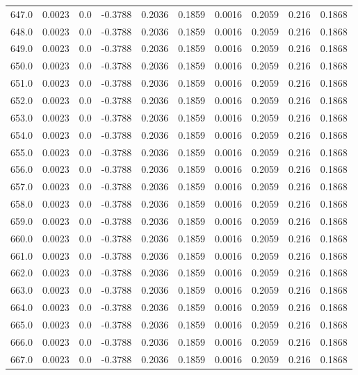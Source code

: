 \begin{longtable}{lrrrrrrrrr}
647.0 & 0.0023 & 0.0 & -0.3788 & 0.2036 & 0.1859 & 0.0016 & 0.2059 & 0.216 & 0.1868 \\
648.0 & 0.0023 & 0.0 & -0.3788 & 0.2036 & 0.1859 & 0.0016 & 0.2059 & 0.216 & 0.1868 \\
649.0 & 0.0023 & 0.0 & -0.3788 & 0.2036 & 0.1859 & 0.0016 & 0.2059 & 0.216 & 0.1868 \\
650.0 & 0.0023 & 0.0 & -0.3788 & 0.2036 & 0.1859 & 0.0016 & 0.2059 & 0.216 & 0.1868 \\
651.0 & 0.0023 & 0.0 & -0.3788 & 0.2036 & 0.1859 & 0.0016 & 0.2059 & 0.216 & 0.1868 \\
652.0 & 0.0023 & 0.0 & -0.3788 & 0.2036 & 0.1859 & 0.0016 & 0.2059 & 0.216 & 0.1868 \\
653.0 & 0.0023 & 0.0 & -0.3788 & 0.2036 & 0.1859 & 0.0016 & 0.2059 & 0.216 & 0.1868 \\
654.0 & 0.0023 & 0.0 & -0.3788 & 0.2036 & 0.1859 & 0.0016 & 0.2059 & 0.216 & 0.1868 \\
655.0 & 0.0023 & 0.0 & -0.3788 & 0.2036 & 0.1859 & 0.0016 & 0.2059 & 0.216 & 0.1868 \\
656.0 & 0.0023 & 0.0 & -0.3788 & 0.2036 & 0.1859 & 0.0016 & 0.2059 & 0.216 & 0.1868 \\
657.0 & 0.0023 & 0.0 & -0.3788 & 0.2036 & 0.1859 & 0.0016 & 0.2059 & 0.216 & 0.1868 \\
658.0 & 0.0023 & 0.0 & -0.3788 & 0.2036 & 0.1859 & 0.0016 & 0.2059 & 0.216 & 0.1868 \\
659.0 & 0.0023 & 0.0 & -0.3788 & 0.2036 & 0.1859 & 0.0016 & 0.2059 & 0.216 & 0.1868 \\
660.0 & 0.0023 & 0.0 & -0.3788 & 0.2036 & 0.1859 & 0.0016 & 0.2059 & 0.216 & 0.1868 \\
661.0 & 0.0023 & 0.0 & -0.3788 & 0.2036 & 0.1859 & 0.0016 & 0.2059 & 0.216 & 0.1868 \\
662.0 & 0.0023 & 0.0 & -0.3788 & 0.2036 & 0.1859 & 0.0016 & 0.2059 & 0.216 & 0.1868 \\
663.0 & 0.0023 & 0.0 & -0.3788 & 0.2036 & 0.1859 & 0.0016 & 0.2059 & 0.216 & 0.1868 \\
664.0 & 0.0023 & 0.0 & -0.3788 & 0.2036 & 0.1859 & 0.0016 & 0.2059 & 0.216 & 0.1868 \\
665.0 & 0.0023 & 0.0 & -0.3788 & 0.2036 & 0.1859 & 0.0016 & 0.2059 & 0.216 & 0.1868 \\
666.0 & 0.0023 & 0.0 & -0.3788 & 0.2036 & 0.1859 & 0.0016 & 0.2059 & 0.216 & 0.1868 \\
667.0 & 0.0023 & 0.0 & -0.3788 & 0.2036 & 0.1859 & 0.0016 & 0.2059 & 0.216 & 0.1868 \\

\end{longtable}
